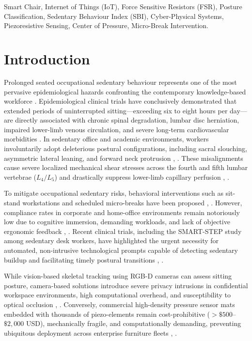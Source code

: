 \documentclass[conference]{IEEEtran}
\begin{document}
\begin{IEEEkeywords}
Smart Chair, Internet of Things (IoT), Force Sensitive Resistors (FSR), Posture Classification, Sedentary Behaviour Index (SBI), Cyber-Physical Systems, Piezoresistive Sensing, Center of Pressure, Micro-Break Intervention.
\end{IEEEkeywords}

\section{Introduction}
Prolonged seated occupational sedentary behaviour represents one of the most pervasive epidemiological hazards confronting the contemporary knowledge-based workforce \cite{odesola2024}. Epidemiological clinical trials have conclusively demonstrated that extended periods of uninterrupted sitting---exceeding six to eight hours per day---are directly associated with chronic spinal degradation, lumbar disc herniation, impaired lower-limb venous circulation, and severe long-term cardiovascular morbidities \cite{tavares2023}. In sedentary office and academic environments, workers involuntarily adopt deleterious postural configurations, including sacral slouching, asymmetric lateral leaning, and forward neck protrusion \cite{lee2022}, \cite{park2019}. These misalignments cause severe localized mechanical shear stresses across the fourth and fifth lumbar vertebrae ($L_4/L_5$) and drastically suppress lower-limb capillary perfusion \cite{sodhi2016}, \cite{ganesh2017}.

To mitigate occupational sedentary risks, behavioral interventions such as sit-stand workstations and scheduled micro-breaks have been proposed \cite{huang2016}, \cite{wang2023}. However, compliance rates in corporate and home-office environments remain notoriously low due to cognitive immersion, demanding workloads, and lack of objective ergonomic feedback \cite{waters2016}, \cite{morton2024}. Recent clinical trials, including the SMART-STEP study among sedentary desk workers, have highlighted the urgent necessity for automated, non-intrusive technological prompts capable of detecting sedentary buildup and facilitating timely postural transitions \cite{coffey2025}, \cite{chandrasekaran2025app}.

While vision-based skeletal tracking using RGB-D cameras can assess sitting posture, camera-based solutions introduce severe privacy intrusions in confidential workspace environments, high computational overhead, and susceptibility to optical occlusion \cite{chandrasekaran2024qual}, \cite{kumar2018}. Conversely, commercial high-density pressure sensor mats embedded with thousands of piezo-elements remain cost-prohibitive ($> \$500$--$\$2,000$ USD), mechanically fragile, and computationally demanding, preventing ubiquitous deployment across enterprise furniture fleets \cite{tavares2023}, \cite{park2019}.
\end{document}
